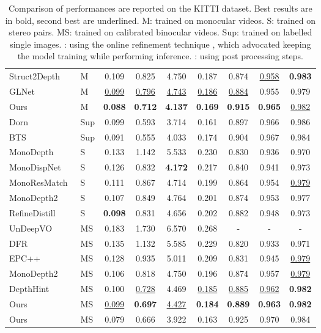 \documentclass[runningheads]{llncs}
\begin{document}
\begin{table}[!t]
\begin{center}
{\begin{tabular}{l|l|cccc|ccc}
\hline
\hline
Struct2Depth~\cite{struct2depth}   &M &0.109 &0.825 &4.750 &0.187 &0.874 &\underline{0.958} &\textbf{0.983}\\
GLNet~\cite{glnet} &M &\underline{0.099} &\underline{0.796} &\underline{4.743} &\underline{0.186} &\underline{0.884} &0.955 &0.979\\
\hline
Ours                           &M &\textbf{0.088} &\textbf{0.712} &\textbf{4.137} &\textbf{0.169} &\textbf{0.915} &\textbf{0.965} &\underline{0.982}\\
\hline
\hline
Dorn~\cite{dorn} &Sup &0.099 &0.593 &3.714 &0.161 &0.897 &0.966 &0.986\\
BTS~\cite{bts} &Sup &0.091 &0.555 &4.033 &0.174 &0.904 &0.967 &0.984\\
\hline
\hline
MonoDepth~\cite{monodepth}         &S &0.133 &1.142 &5.533 &0.230 &0.830 &0.936 &0.970\\
MonoDispNet~\cite{monodispnet}     &S &0.126 &0.832 &\textbf{4.172} &0.217 &0.840 &0.941 &0.973\\
MonoResMatch~\cite{monoresmatch}   &S &0.111 &0.867 &4.714 &0.199 &0.864 &0.954 &\underline{0.979}\\
MonoDepth2~\cite{monodepth2}       &S &0.107 &0.849 &4.764 &0.201 &0.874 &0.953 &0.977\\
RefineDistill~\cite{refinedistill} &S &\textbf{0.098} &0.831 &4.656 &0.202 &0.882 &0.948 &0.973\\
UnDeepVO~\cite{undeepvo}           &MS &0.183 &1.730 &6.570 &0.268 &- &- &-\\
DFR~\cite{dfr}                     &MS &0.135 &1.132 &5.585 &0.229 &0.820 &0.933 &0.971\\
EPC++~\cite{epc++}                 &MS &0.128 &0.935 &5.011 &0.209 &0.831 &0.945 &\underline{0.979}\\
MonoDepth2~\cite{monodepth2}       &MS &0.106 &0.818 &4.750 &0.196 &0.874 &0.957 &\underline{0.979}\\
DepthHint~\cite{depthhint}         &MS &0.100 &\underline{0.728} &4.469 &\underline{0.185} &\underline{0.885} &\underline{0.962} &\textbf{0.982}\\
\hline
Ours                               &MS &\underline{0.099} &\textbf{0.697} &\underline{4.427} &\textbf{0.184} &\textbf{0.889} &\textbf{0.963} &\textbf{0.982}\\
\hline
\hline
Ours                  &MS &0.079 &0.666 &3.922 &0.163 &0.925 &0.970 &0.984\\
\hline
\end{tabular}
}
\caption{
Comparison of performances are reported on the KITTI dataset. 
Best results are in bold, second best are underlined.
M: trained on monocular videos.
S: trained on stereo pairs.
MS: trained on calibrated binocular videos.
Sup: trained on labelled single images.
: using the online refinement technique \cite{struct2depth}, which advocated keeping the model training while performing inference.
: using post processing steps.
}
\label{tab2}
\end{center}
\end{table}
\end{document}
